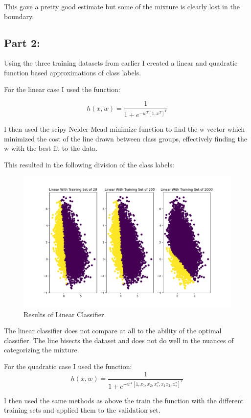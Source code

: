 \documentclass[11pt]{article}
\begin{document}
This gave a pretty good estimate but some of the mixture is clearly lost in the boundary.

\subsection*{Part 2:}
Using the three training datasets from earlier I created a linear and quadratic function based approximations of class labels.

For the linear case I used the function:

\[
	h(x,w) = \frac{1}{1 + e^{-w^T [1,x^T]^T}}
\]

I then used the scipy Nelder-Mead minimize function to find the w vector which minimized the cost of the line drawn between class groups,
effectively finding the w with the best fit to the data.

This resulted in the following division of the class labels:

\begin{figure}[H]
	\centering
	\includegraphics[width=1.0\textwidth]{linear_data}
	\caption{Results of Linear Classifier}
\end{figure}

The linear classifier does not compare at all to the ability of the optimal classifier.
The line bisects the dataset and does not do well in the nuances of categorizing the mixture.

For the quadratic case I used the function:
\[
	h(x,w) = \frac{1}{1 + e^{-w^T [1,x_1,x_2,x_1^2,x_1x_2,x_2^2]^T}}
\]

I then used the same methods as above the train the function with the different training sets and applied them to the validation set.
\end{document}
